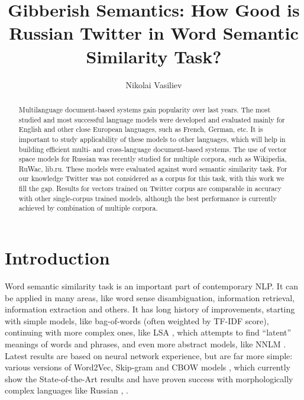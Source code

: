 \documentclass{llncs}
\begin{document}
\title{Gibberish Semantics: How Good is Russian Twitter in Word Semantic Similarity Task?}
%
\author{Nikolai Vasiliev}
%
%
%

\maketitle              %

\begin{abstract}
Multilanguage document-based systems gain popularity over last years. The most studied and most successful language models were developed and evaluated mainly for English and other close European languages, such as French, German, etc. It is important to study applicability of these models to other languages, which will help in building efficient multi- and cross-language document-based systems. The use of vector space models for Russian was recently studied for multiple corpora, such as Wikipedia, RuWac, lib.ru. These models were evaluated against word semantic similarity task. For our knowledge Twitter was not considered as a corpus for this task, with this work we fill the gap. Results for vectors trained on Twitter corpus are comparable in accuracy with other single-corpus trained models, although the best performance is currently achieved by combination of multiple corpora.
\end{abstract}
%
\section{Introduction}
%
Word semantic similarity task is an important part of contemporary NLP. It can be applied in many areas, like word sense disambiguation, information retrieval, information extraction and others. It has long history of improvements, starting with simple models, like bag-of-words (often weighted by TF-IDF score), continuing with more complex ones, like LSA \cite{LSA}, which attempts to find “latent” meanings of words and phrases, and even more abstract models, like NNLM \cite{NNLM}. Latest results are based on neural network experience, but are far more simple: various versions of Word2Vec, Skip-gram and CBOW models \cite{Word2Vec}, which currently show the State-of-the-Art results and have proven success with morphologically complex languages like Russian \cite{Arefyev}, \cite{Panchenko2015}. 
\end{document}
